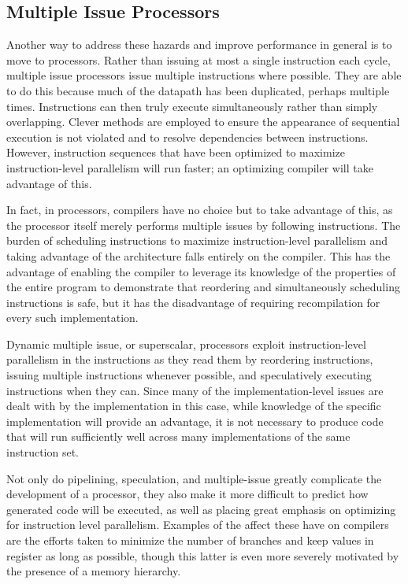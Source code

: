 \subsection{Multiple Issue Processors}
Another way to address these hazards and improve performance in general is to move to  processors. Rather than issuing at most a single instruction each cycle, multiple issue processors issue multiple instructions where possible. They are able to do this because much of the datapath has been duplicated, perhaps multiple times. Instructions can then truly execute simultaneously rather than simply overlapping. Clever methods are employed to ensure the appearance of sequential execution is not violated and to resolve dependencies between instructions. However, instruction sequences that have been optimized to maximize instruction-level parallelism will run faster; an optimizing compiler will take advantage of this.

In fact, in  processors, compilers have no choice but to take advantage of this, as the processor itself merely performs multiple issues by following instructions. The burden of scheduling instructions to maximize instruction-level parallelism and taking advantage of the architecture falls entirely on the compiler. This has the advantage of enabling the compiler to leverage its knowledge of the properties of the entire program to demonstrate that reordering and simultaneously scheduling instructions is safe, but it has the disadvantage of requiring recompilation for every such implementation. %

Dynamic multiple issue, or superscalar, processors exploit instruction-level parallelism in the instructions as they read them by reordering instructions, issuing multiple instructions whenever possible, and speculatively executing instructions when they can. Since many of the implementation-level issues are dealt with by the implementation in this case, while knowledge of the specific implementation will provide an advantage, it is not necessary to produce code that will run sufficiently well across many implementations of the same instruction set. %

Not only do pipelining, speculation, and multiple-issue greatly complicate the development of a processor, they also make it more difficult to predict how generated code will be executed, as well as placing great emphasis on optimizing for instruction level parallelism. Examples of the affect these have on compilers are the efforts taken to minimize the number of branches and keep values in register as long as possible, though this latter is even more severely motivated by the presence of a memory hierarchy.

